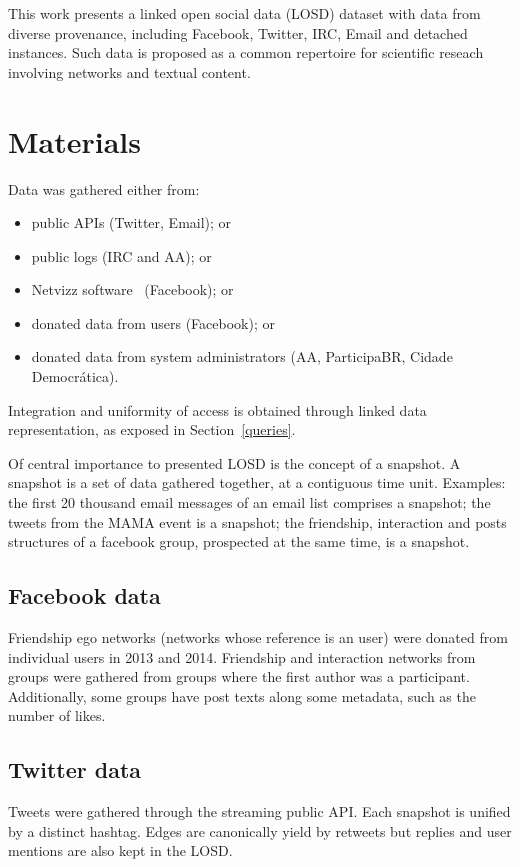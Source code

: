 \documentclass[review]{elsarticle}
\begin{document}
This work presents a linked open social data (LOSD) dataset with data from diverse
provenance, including Facebook, Twitter, IRC, Email and detached
instances.
Such data is proposed as a common repertoire for scientific
reseach involving networks and textual content.


\section{Materials}\label{materials}
Data was gathered either from:
\begin{itemize}
    \item public APIs (Twitter, Email); or
    \item public logs (IRC and AA); or
    \item Netvizz software~\cite{netvizz} (Facebook); or
    \item donated data from users (Facebook); or
    \item donated data from system administrators (AA, ParticipaBR,
        Cidade Democr\'atica).
\end{itemize}

Integration and uniformity of access is obtained through linked data
representation, as exposed in Section~\ref{queries}.

Of central importance to presented LOSD is the concept of a snapshot.
A snapshot is a set of data gathered together, at a contiguous time
unit.
Examples: the first 20 thousand email messages of an email list
comprises a snapshot; the tweets from the MAMA event is a
snapshot; the friendship, interaction and posts structures of a facebook
group, prospected at the same time, is a snapshot.

\subsection{Facebook data}
Friendship ego networks (networks whose reference is an user)
were donated from individual users in 2013 and 2014.
Friendship and interaction networks from groups were gathered from
groups where the first author was a participant.
Additionally, some groups have post texts along some metadata, such as
the number of likes.

\subsection{Twitter data}
Tweets were gathered through the streaming public API.
Each snapshot is unified by a distinct hashtag.
Edges are canonically yield by retweets but replies and user mentions
are also kept in the LOSD.
\end{document}
